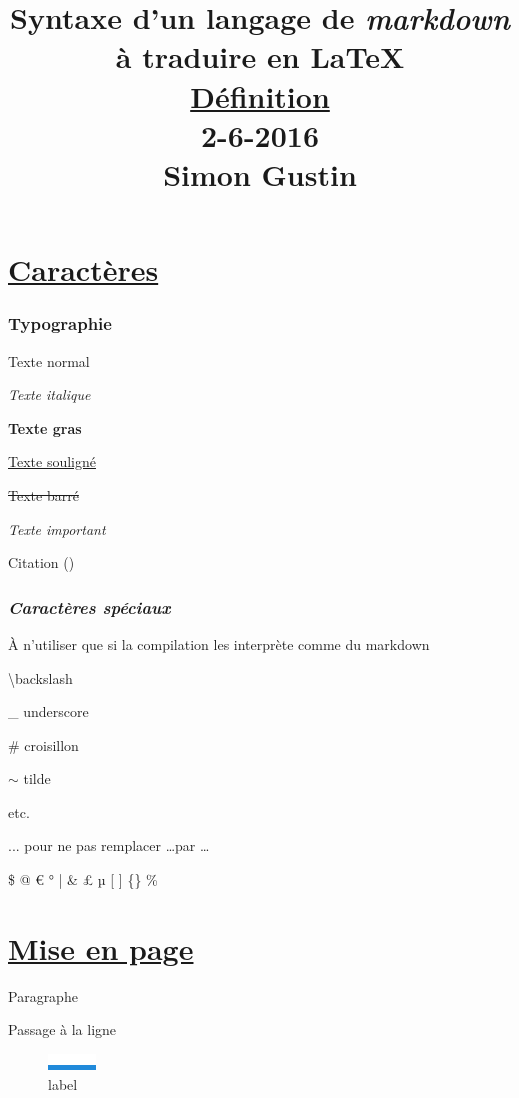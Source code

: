 \documentclass{article}
\title{Syntaxe d'un langage de \textit{markdown} à traduire en LaTeX\\\underline{Définition}\\2-6-2016\\Simon Gustin}
\author{}
\date{}
\begin{document}
\maketitle

	

	\part{\underline{Caractères}}

		\section{\textbf{Typographie}}

			Texte normal

			\textit{Texte italique}

			\textbf{Texte gras}

			\underline{Texte souligné}

			\sout{Texte barré}

			\emph{Texte important}

			\textrm{ Citation (})

			

		\section{\textit{Caractères spéciaux}}%

			À n'utiliser que si la compilation les interprète comme du markdown

			\textbackslash  backslash

			\_ underscore

			\# croisillon

			$\sim$ tilde

			etc.

			

			... pour ne pas remplacer \dots  par …

			

			\$ @ € ° | \& £ µ [ ] \{\} \%%

			

	\part{\underline{Mise en page}}

		Paragraphe

		Passage à la ligne

		

		\begin{figure}[h!]
			\centering
			\includegraphics{image.png}
			\caption{label}
		\end{figure}
\end{document}
